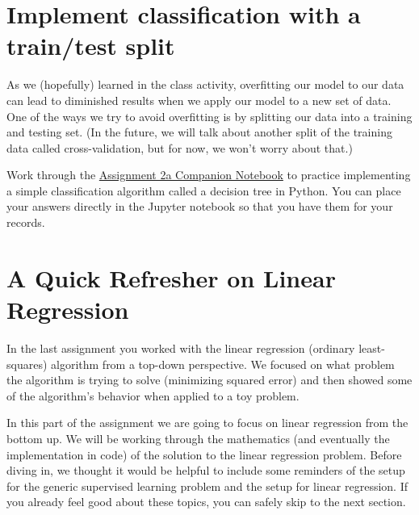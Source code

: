 \documentclass[assignment02_Solutions]{subfiles}
\begin{document}
	

\section{Implement classification with a train/test split}

As we (hopefully) learned in the class activity, overfitting our model to our data can lead to diminished results when we apply our model to a new set of data. One of the ways we try to avoid overfitting is by splitting our data into a training and testing set. (In the future, we will talk about another split of the training data called cross-validation, but for now, we won't worry about that.)


\begin{externalresources}[(60 minutes)]
Work through the \href{}{Assignment 2a Companion Notebook} to practice implementing a simple classification algorithm called a decision tree in Python. You can place your answers directly in the Jupyter notebook so that you have them for your records.
\end{externalresources}


\section{A Quick Refresher on Linear Regression}

In the last assignment you worked with the linear regression (ordinary least-squares) algorithm from a top-down perspective.  We focused on what problem the algorithm is trying to solve (minimizing squared error) and then showed some of the algorithm's behavior when applied to a toy problem.

In this part of the assignment we are going to focus on linear regression from the bottom up.  We will be working through the mathematics (and eventually the implementation in code) of the solution to the linear regression problem.  Before diving in, we thought it would be helpful to include some reminders of the setup for the generic supervised learning problem and the setup for linear regression.  If you already feel good about these topics, you can safely skip to the next section.

\vspace{1em}
\end{document}
